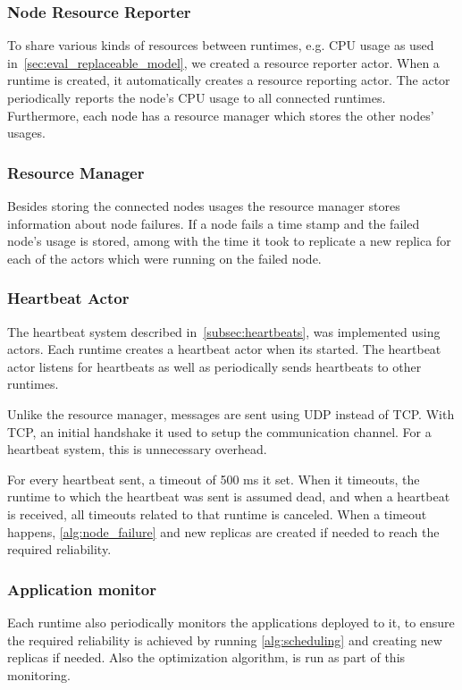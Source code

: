 \documentclass{cslthse-msc}
\begin{document}

\subsubsection{Node Resource Reporter}
To share various kinds of resources between runtimes, e.g. CPU usage as used in~\cref{sec:eval_replaceable_model}, we created a resource reporter actor. When a runtime is created, it automatically creates a resource reporting actor. The actor periodically reports the node's CPU usage to all connected runtimes. Furthermore, each node has a resource manager which stores the other nodes' usages.


\subsubsection{Resource Manager}
Besides storing the connected nodes usages the resource manager stores information about node failures. If a node fails a time stamp and the failed node's usage is stored, among with the time it took to replicate a new replica for each of the actors which were running on the failed node.


\subsubsection{Heartbeat Actor}
The heartbeat system described in~\cref{subsec:heartbeats}, was implemented using actors. Each runtime creates a heartbeat actor when its started. The heartbeat actor listens for heartbeats as well as periodically sends heartbeats to other runtimes.

Unlike the resource manager, messages are sent using UDP instead of TCP. With TCP, an initial handshake it used to setup the communication channel. For a heartbeat system, this is unnecessary overhead. 

For every heartbeat sent, a timeout of 500 ms it set. When it timeouts, the runtime to which the heartbeat was sent is assumed dead, and when a heartbeat is received, all timeouts related to that runtime is canceled. When a timeout happens, \cref{alg:node_failure} and new replicas are created if needed to reach the required reliability.

\subsubsection{Application monitor}
Each runtime also periodically monitors the applications deployed to it, to ensure the required reliability is achieved by running \cref{alg:scheduling} and creating new replicas if needed. Also the optimization algorithm, is run as part of this monitoring.
\end{document}

